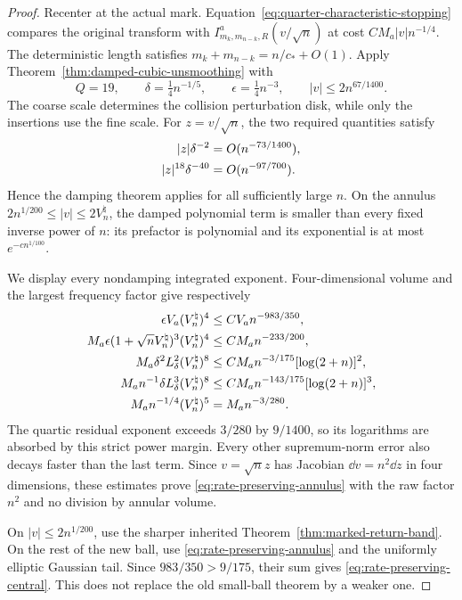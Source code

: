 \begin{proof}
Recenter at the actual mark. Equation~\eqref{eq:quarter-characteristic-stopping}
compares the original transform with
$I^a_{m_k,m_{n-k},R}(v/\sqrt n)$ at cost $CM_a|v|n^{-1/4}$.
The deterministic length satisfies $m_k+m_{n-k}=n/c_*+O(1)$.
Apply Theorem~\ref{thm:damped-cubic-unsmoothing} with
\[
 Q=19,\qquad \delta=\tfrac14 n^{-1/5},\qquad
 \epsilon=\tfrac14 n^{-3},\qquad |v|\le2n^{67/1400}.
\]
The coarse scale determines the collision perturbation disk, while
only the insertions use the fine scale. For $z=v/\sqrt n$, the two
required quantities satisfy
\begin{align}
 |z|\delta^{-2}&=O(n^{-73/1400}),\notag\\
 |z|^{18}\delta^{-40}&=O(n^{-97/700}).
 \label{eq:rate-preserving-damping-domain}
\end{align}
Hence the damping theorem applies for all sufficiently large $n$.
On the annulus $2n^{1/200}\le|v|\le2V_n^\natural$, the damped
polynomial term is smaller than every fixed inverse power of $n$:
its prefactor is polynomial and its exponential is at most
$e^{-c n^{1/100}}$.

We display every nondamping integrated exponent. Four-dimensional
volume and the largest frequency factor give respectively
\begin{align}
 \epsilon V_a(V_n^\natural)^4
      &\le C V_an^{-983/350},\notag\\
 M_a\epsilon(1+\sqrt n V_n^\natural)^3(V_n^\natural)^4
      &\le C M_an^{-233/200},\notag\\
 M_a\delta^2L_\delta^2(V_n^\natural)^8
      &\le C M_an^{-3/175}[\log(2+n)]^2,\notag\\
 M_an^{-1}\delta L_\delta^3(V_n^\natural)^8
      &\le C M_an^{-143/175}[\log(2+n)]^3,\notag\\
 M_an^{-1/4}(V_n^\natural)^5
      &= M_an^{-3/280}.
 \label{eq:rate-preserving-exponents}
\end{align}
The quartic residual exponent exceeds $3/280$ by $9/1400$, so its
logarithms are absorbed by this strict power margin. Every other
supremum-norm error also decays faster than the last term. Since
$v=\sqrt n z$ has Jacobian $\dd v=n^2\dd z$ in four dimensions,
these estimates prove \eqref{eq:rate-preserving-annulus} with the
raw factor $n^2$ and no division by annular volume.

On $|v|\le2n^{1/200}$, use the sharper inherited
Theorem~\ref{thm:marked-return-band}. On the rest of the new ball,
use \eqref{eq:rate-preserving-annulus} and the uniformly elliptic
Gaussian tail. Since $983/350>9/175$, their sum gives
\eqref{eq:rate-preserving-central}. This does not replace the old
small-ball theorem by a weaker one.
\end{proof}


